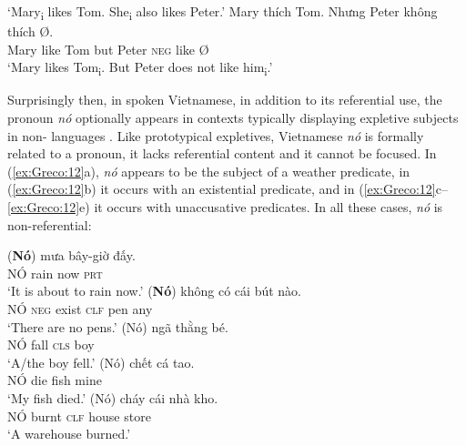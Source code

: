 \documentclass[output=paper]{LSP/langsci}
\begin{document}
\settowidth{}
\ea%
    \label{ex:Greco:11}
	\glt ‘Mary\textsubscript{i} likes Tom. She\textsubscript{i} also likes Peter.’
    \ex \gll Mary   thích   Tom.   Nhưng Peter   không   thích Ø.\\
	     Mary   like    Tom   but      Peter     \textsc{neg}    like   Ø\\
	\glt ‘Mary likes Tom\textsubscript{i}. But Peter does not like him\textsubscript{i}.’
    \z
\z

Surprisingly then, in spoken Vietnamese, in addition to its referential use, the pronoun \textit{nó} optionally appears in contexts typically displaying expletive subjects in non- languages \citep{NguyenEtAl2011,Dao2012}. Like prototypical expletives, Vietnamese \textit{nó} is formally related to a pronoun, it lacks referential content and it cannot be focused. In (\ref{ex:Greco:12}a), \textit{nó} appears to be the subject of a weather predicate, in (\ref{ex:Greco:12}b) it occurs with an existential predicate, and in (\ref{ex:Greco:12}c--\ref{ex:Greco:12}e) it occurs with unaccusative predicates. In all these cases, \textit{nó} is non-referential:

\ea%
    \label{ex:Greco:12}
	\ea \label{ex:Greco:12a} \gll (\textbf{Nó})  mưa  bây-giờ  đấy.\\
			NÓ  rain  now    \textsc{prt}\\
		\glt ‘It is about to rain now.’
	\ex \label{ex:Greco:12b} \gll (\textbf{Nó})  không  có  cái  bút  nào.{\upshape\footnotemark}\\
		NÓ  \textsc{neg}  exist  \textsc{clf}  pen  any\\
		\glt ‘There are no pens.’
	\ex \label{ex:Greco:12c} \gll (Nó)   ngã  thằng  bé.\\
			  NÓ  fall  \textsc{cls}  boy\\
		\glt ‘A/the boy fell.’
	\ex \label{ex:Greco:12d} \gll (Nó)   chết  cá  tao.\\
			  NÓ   die  fish  mine\\
		\glt ‘My fish died.’
	\ex \label{ex:Greco:12e} \gll (Nó)   cháy  cái      nhà     kho.\\
		    NÓ     burnt   \textsc{clf}  house  store\\
		\glt ‘A warehouse burned.’
	\z
\z
{}
\end{document}
